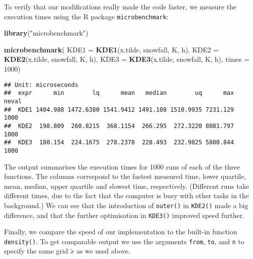 \documentclass[
  a4paper,
]{article}
\newenvironment{Shaded}{\begin{snugshade}}{\end{snugshade}}
\newcommand{\AttributeTok}[1]{\textcolor[rgb]{0.13,0.29,0.53}{#1}}
\newcommand{\ControlFlowTok}[1]{\textcolor[rgb]{0.13,0.29,0.53}{\textbf{#1}}}
\newcommand{\DecValTok}[1]{\textcolor[rgb]{0.00,0.00,0.81}{#1}}
\newcommand{\FunctionTok}[1]{\textcolor[rgb]{0.13,0.29,0.53}{\textbf{#1}}}
\newcommand{\NormalTok}[1]{#1}
\newcommand{\OtherTok}[1]{\textcolor[rgb]{0.56,0.35,0.01}{#1}}
\newcommand{\SpecialCharTok}[1]{\textcolor[rgb]{0.81,0.36,0.00}{\textbf{#1}}}
\newcommand{\StringTok}[1]{\textcolor[rgb]{0.31,0.60,0.02}{#1}}
\theoremstyle{definition}
\theoremstyle{definition}
\theoremstyle{definition}
\theoremstyle{definition}
\theoremstyle{remark}
\begin{document}
To verify that our modifications really made the code faster, we measure
the execution times using the R package \texttt{microbenchmark}:

\begin{Shaded}
\begin{Highlighting}[]
\FunctionTok{library}\NormalTok{(}\StringTok{"microbenchmark"}\NormalTok{)}

\FunctionTok{microbenchmark}\NormalTok{(}
  \AttributeTok{KDE1 =} \FunctionTok{KDE1}\NormalTok{(x.tilde, snowfall, K, h),}
  \AttributeTok{KDE2 =} \FunctionTok{KDE2}\NormalTok{(x.tilde, snowfall, K, h),}
  \AttributeTok{KDE3 =} \FunctionTok{KDE3}\NormalTok{(x.tilde, snowfall, K, h),}
  \AttributeTok{times =} \DecValTok{1000}\NormalTok{)}
\end{Highlighting}
\end{Shaded}

\begin{verbatim}
## Unit: microseconds
##  expr      min        lq      mean   median        uq      max neval
##  KDE1 1404.988 1472.6380 1541.9412 1491.108 1510.9935 7231.129  1000
##  KDE2  198.809  260.8215  368.1154  266.295  272.3220 8081.797  1000
##  KDE3  180.154  224.1675  278.2378  228.493  232.9825 5800.844  1000
\end{verbatim}

The output summarises the execution times for 1000 runs of each of the
three functions. The columns correspond to the fastest measured time,
lower quartile, mean, median, upper quartile and slowest time, respectively.
(Different runs take different times, due to the fact that the computer
is busy with other tasks in the background.) We can see that the introduction
of \texttt{outer()} in \texttt{KDE2()} made a big difference, and that the further
optimisation in \texttt{KDE3()} improved speed further.

Finally, we compare the speed of our implementation to the built-in
function \texttt{density()}. To get comparable output we use the arguments
\texttt{from}, \texttt{to}, and \texttt{n} to specify the same grid \(\tilde x\)
as we used above.

\begin{Shaded}
\end{Shaded}
\end{document}
